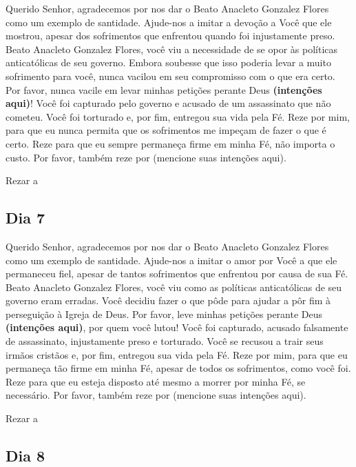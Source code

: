 \documentclass[a4paper,14pt,twoside]{extarticle} \usepackage[utf8]{inputenc}
\begin{document}
Querido Senhor, agradecemos por nos dar o Beato Anacleto Gonzalez Flores como um exemplo de santidade. Ajude-nos a imitar a devoção a Você que ele mostrou, apesar dos sofrimentos que enfrentou quando foi injustamente preso. Beato Anacleto Gonzalez Flores, você viu a necessidade de se opor às políticas anticatólicas de seu governo. Embora soubesse que isso poderia levar a muito sofrimento para você, nunca vacilou em seu compromisso com o que era certo. Por favor, nunca vacile em levar minhas petições perante Deus \textbf{(intenções aqui)}! Você foi capturado pelo governo e acusado de um assassinato que não cometeu. Você foi torturado e, por fim, entregou sua vida pela Fé. Reze por mim, para que eu nunca permita que os sofrimentos me impeçam de fazer o que é certo. Reze para que eu sempre permaneça firme em minha Fé, não importa o custo. Por favor, também reze por (mencione suas intenções aqui). 

Rezar a \textbf{}

\subsection{Dia 7}

Querido Senhor, agradecemos por nos dar o Beato Anacleto Gonzalez Flores como um exemplo de santidade. Ajude-nos a imitar o amor por Você a que ele permaneceu fiel, apesar de tantos sofrimentos que enfrentou por causa de sua Fé. Beato Anacleto Gonzalez Flores, você viu como as políticas anticatólicas de seu governo eram erradas. Você decidiu fazer o que pôde para ajudar a pôr fim à perseguição à Igreja de Deus. Por favor, leve minhas petições perante Deus \textbf{(intenções aqui)}, por quem você lutou! Você foi capturado, acusado falsamente de assassinato, injustamente preso e torturado. Você se recusou a trair seus irmãos cristãos e, por fim, entregou sua vida pela Fé. Reze por mim, para que eu permaneça tão firme em minha Fé, apesar de todos os sofrimentos, como você foi. Reze para que eu esteja disposto até mesmo a morrer por minha Fé, se necessário. Por favor, também reze por (mencione suas intenções aqui). 

Rezar a \textbf{}

\subsection{Dia 8}
\end{document}
